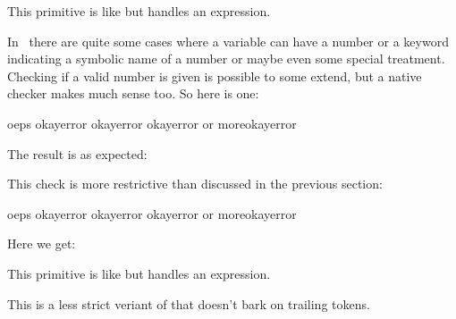 {\getbuffer}

\stopnewprimitive

\startnewprimitive[title={\prm {ifchkdimexpr}}]

This primitive is like  but handles an expression.

\stopnewprimitive

\startnewprimitive[title={\prm {ifchknum}}]

In \CONTEXT\ there are quite some cases where a variable can have a number or a
keyword indicating a symbolic name of a number or maybe even some special
treatment. Checking if a valid number is given is possible to some extend, but a
native checker makes much sense too. So here is one:

\startbuffer
\ifchknum oeps        \or okay\else error\fi\quad
{}          \or okay\else error\fi\quad
\ifchknum 12pt        \or okay\else error\fi\quad
\ifchknum 12pt or more\or okay\else error\fi
\stopbuffer

\typebuffer

The result is as expected:

{\getbuffer}

\stopnewprimitive

\startnewprimitive[title={\prm {ifchknumber}}]

This check is more restrictive than  discussed in the previous
section:

\startbuffer
\ifchknumber oeps        \or okay\else error\fi\quad
{}          \or okay\else error\fi\quad
\ifchknumber 12pt        \or okay\else error\fi\quad
\ifchknumber 12pt or more\or okay\else error\fi
\stopbuffer

\typebuffer

Here we get:

{\getbuffer}

\stopnewprimitive

\startnewprimitive[title={\prm {ifchknumexpr}}]

This primitive is like  but handles an expression.

\stopnewprimitive

\startnewprimitive[title={\prm {ifcmpdim}}]

This is a less strict veriant of  that doesn't bark on
trailing tokens.

\stopnewprimitive

\startnewprimitive[title={\prm {ifcmpnum}}]

